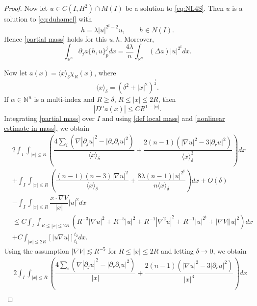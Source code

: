 \documentclass[11pt,a4paper]{article}
\numberwithin{equation}{section}
\begin{document}
\begin{proof}
Now let $u\in C(I, H^{2}) \cap M(I)$ be a solution to \eqref{eq:NL4S}. Then $u$ is a solution to \eqref{eq:duhamel} with
\[
h = \lambda |u|^{2^{\sharp}-2}u,\qquad h\in N(I).
\]
Hence \eqref{partial mass} holds for this $u,h$. Moreover,
\begin{equation}\label{nonlinear estimate in mass}
\int_{\mathbb{R}^{n}}\partial_{j}a\{h, u\}_{p}^{j}dx = \dfrac{4\lambda}{n}\int_{\mathbb{R}^{n}}(\Delta a)|u|^{2^{\sharp}} dx.
\end{equation}

Now let $a(x) = \langle x \rangle_{\delta}\chi_{R}(x)$, where
\[
\langle x \rangle_{\delta} = (\delta^{2} + |x|^{2})^{\frac{1}{2}}.
\]
If $\alpha \in \mathbb{N}^{n}$ is a multi-index and $R \geq \delta$, $R \leq |x| \leq 2R$, then
\begin{equation}
|D^{\alpha}a(x)| \leq CR^{1 - |\alpha|}.
\end{equation}
Integrating \eqref{partial mass} over $I$ and using \eqref{def local mass} and \eqref{nonlinear estimate in mass}, we obtain
\begin{equation}
\begin{aligned}
&2\int_{I}\int_{|x| \leq R}\left( \dfrac{4\sum_{i}(\nabla|\partial_{j}u|^{2} - |\partial_{r}\partial_{i}u|^{2})}{\langle x \rangle_{\delta}} + \dfrac{2(n-1)(|\nabla u|^{2}-3|\partial_{r}u|^{2})}{\langle x \rangle_{\delta}^{3}}\right) dx \\
&+ \int_{I}\int_{|x| \leq R}\left( \dfrac{(n-1)(n-3)|\nabla u|^{2}}{\langle x \rangle_{\delta}} + \dfrac{8\lambda (n - 1)|u|^{2^{\sharp}}}{n\langle x \rangle_{\delta}}\right) dx + O(\delta)\\
&- \int_{I}\int_{|x| \leq R} \dfrac{x \cdot \nabla V}{|x|}|u|^{2} dx \\
&\leq C\int_{I}\int_{R \leq |x| \leq 2R} \left(R^{-3}|\nabla u|^{2} + R^{-5}|u|^{2} + R^{-1}|\nabla^{2}u|^{2} + R^{-1}|u|^{2^{\sharp}} + |\nabla V||u|^{2}\right)dx \\
&+ C\int_{|x| \leq 2R}\left[ |u\nabla u| \right]_{t_{1}}^{t_{2}}dx.
\end{aligned}
\end{equation}
Using the assumption $|\nabla V| \lesssim R^{-5}$ for $R \leq |x| \leq 2R$ and letting $\delta \to 0$, we obtain
\begin{equation}
\begin{aligned}
&2\int_{I}\int_{|x| \leq R}\left( \dfrac{4\sum_{i}(\nabla|\partial_{j}u|^{2} - |\partial_{r}\partial_{i}u|^{2})}{|x|} + \dfrac{2(n-1)(|\nabla u|^{2}-3|\partial_{r}u|^{2})}{|x|^{3}}\right) dx \\

\end{aligned}
\end{equation}
\end{proof}
\end{document}
